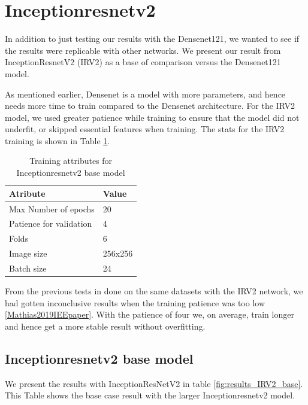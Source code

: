 \FloatBarrier
\section{Inceptionresnetv2}
In addition to just testing our results with the Densenet121, we wanted to see if the results were replicable with other networks. We present our result from InceptionResnetV2 (IRV2) as a base of comparison versus the Densenet121 model. 


As mentioned earlier, Densenet is a model with more parameters, and hence needs more time to train compared to the Densenet architecture. 
For the IRV2 model, we used greater patience while training to ensure that the model did not underfit, or skipped essential features when training.
The stats for the IRV2 training is shown in Table \ref{tab:TrainingAttrIRV2}.



\begin{table}[h]
\caption{Training attributes for Inceptionresnetv2 base model }
\begin{center}
\begin{tabular}{ll}
\toprule
Atribute                & Value   \\
\midrule
Max Number of epochs    & 20      \\
Patience for validation & 4       \\
Folds                   & 6       \\
Image size              & 256x256 \\
Batch size              & 24      \\   
\bottomrule
\end{tabular}
\end{center}
\label{tab:TrainingAttrIRV2}
\end{table}

From the previous tests in done on the same datasets with the IRV2 network, we had gotten inconclusive results when the training patience was too low \ref{Mathias2019IEEpaper}. With the patience of four we, on average, train longer and hence get a more stable result without overfitting.

\subsection{Inceptionresnetv2 base model}

We present the results with InceptionResNetV2 in table \ref{fig:results_IRV2_base}.
This Table shows the base case result with the larger Inceptionresnetv2 model. 

